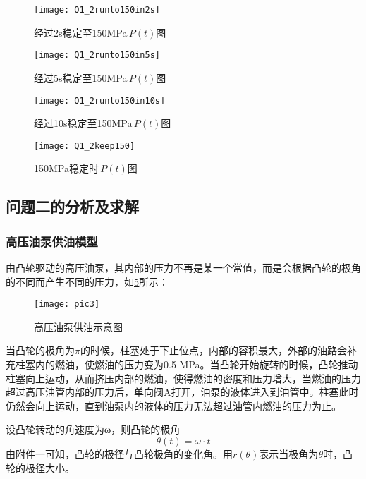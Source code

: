 \documentclass[withoutpreface,bwprint]{cumcmthesis} %
\begin{document}
\begin{figure}[!h]
	\centering
	\texttt{[image: Q1\_2runto150in2s]}
	\caption{经过2s稳定至150MPa$\,P(t)$图}
	\label{fig:Q1_2runto150in2s}
\end{figure}

\begin{figure}[!h]
	\centering
	\texttt{[image: Q1\_2runto150in5s]}
	\caption{经过5s稳定至150MPa$\,P(t)$图}
	\label{fig:Q1_2runto150in5s}
\end{figure}

\begin{figure}[!h]
	\centering
	\texttt{[image: Q1\_2runto150in10s]}
	\caption{经过10s稳定至150MPa$\,P(t)$图}
	\label{fig:Q1_2runto150in10s}
\end{figure}

\begin{figure}[!h]
	\centering
	\texttt{[image: Q1\_2keep150]}
	\caption{150MPa稳定时$\,P(t)$图}
	\label{fig:Q1_2keep150}
\end{figure}

\subsection{问题二的分析及求解}
\subsubsection{高压油泵供油模型}
由凸轮驱动的高压油泵，其内部的压力不再是某一个常值，而是会根据凸轮的极角的不同而产生不同的压力，如\cref{fig:tulun}所示：



\begin{figure}[!h]
	\centering
	\texttt{[image: pic3]}
	\caption{高压油泵供油示意图}
	\label{fig:tulun}
\end{figure}

当凸轮的极角为$\pi$的时候，柱塞处于下止位点，内部的容积最大，外部的油路会补充柱塞内的燃油，使燃油的压力变为0.5 MPa。当凸轮开始旋转的时候，凸轮推动柱塞向上运动，从而挤压内部的燃油，使得燃油的密度和压力增大，当燃油的压力超过高压油管内部的压力后，单向阀A打开，油泵的液体进入到油管中。柱塞此时仍然会向上运动，直到油泵内的液体的压力无法超过油管内燃油的压力为止。

设凸轮转动的角速度为ω，则凸轮的极角
\begin{equation}
\theta(t)=\omega \cdot t
\end{equation}
由附件一可知，凸轮的极径与凸轮极角的变化角。用$r(\theta)$表示当极角为$\theta$时，凸轮的极径大小。
\end{document}
